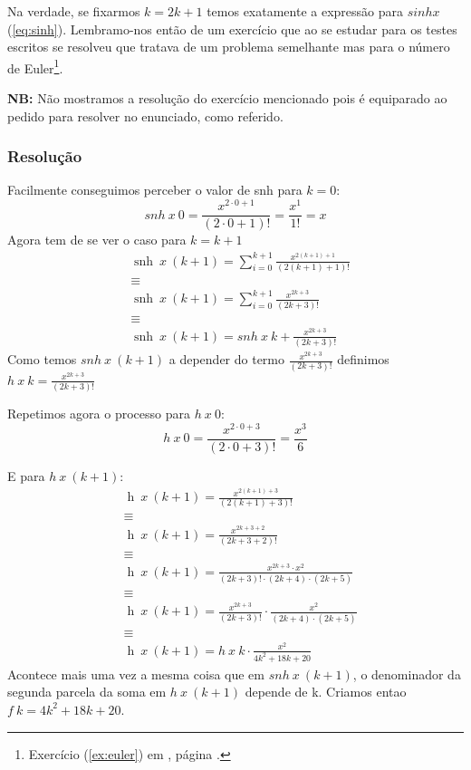 \documentclass[11pt, a4paper, fleqn]{article}
\DeclareMathOperator{\snh}{snh}
\DeclareMathOperator{\h}{h}
\begin{document}
Na verdade, se fixarmos $k = 2k + 1$ temos exatamente a expressão para $sinh x$ (\ref{eq:sinh}). Lembramo-nos então de um exercício que ao se estudar para os testes escritos
se resolveu que tratava de um problema semelhante mas para o número de Euler\footnote{Exercício (\ref{ex:euler}) em \cite{Ol18}, página \pageref{ex:euler}.}.

\noindent
\textbf{NB:} Não mostramos a resolução do exercício mencionado pois é equiparado ao pedido para resolver no enunciado, como referido.

\subsubsection*{Resolução}

Facilmente conseguimos perceber o valor de snh para $k = 0$:
\[
    snh\ x\ 0 = \frac{x^{2 \cdot 0 + 1 }}{(2 \cdot 0 + 1)!} = \frac{x^1}{1!} = x
\]
\noindent
Agora tem de se ver o caso para $k = k + 1$
\[
\begin{split}
    &\snh\ x\ (k + 1) = \sum_{i=0}^{k+1} \frac{x^{2(k + 1) + 1}}{(2(k + 1) + 1)!} \\
    &\equiv \\
    &\snh\ x\ (k + 1) = \sum_{i=0}^{k+1} \frac{x^{2k + 3}}{(2k + 3)!} \\
    &\equiv \\
    &\snh\ x\ (k + 1) = snh\ x\ k + \frac{x^{2k + 3}}{(2k + 3)!}
\end{split} 
\]
\noindent
Como temos $snh\ x\ (k+1)$ a depender do termo $\frac{x^{2k + 3}}{(2k + 3)!}$ definimos $h\ x\ k = \frac{x^{2k + 3}}{(2k + 3)!}$

Repetimos agora o processo para $h\ x\ 0$:
\[
    h\ x\ 0 = \frac{x^{2 \cdot 0 + 3}}{(2 \cdot 0 + 3)!} = \frac{x^3}{6}
\]

E para $h\ x\ (k+1)$:
\[
\begin{split}
    &\h\ x\ (k + 1) = \frac{x^{2(k + 1) + 3}}{(2(k + 1) + 3)!} \\
    &\equiv \\
    &\h\ x\ (k + 1) = \frac{x^{2k + 3 + 2}}{(2k + 3 + 2)!} \\
    &\equiv \\
    &\h\ x\ (k + 1) = \frac{x^{2k + 3} \cdot x^{2}}{(2k + 3)! \cdot (2k + 4) \cdot (2k + 5)} \\
    &\equiv \\
    &\h\ x\ (k + 1) = \frac{x^{2k + 3}}{(2k + 3)!} \cdot \frac{x^{2}}{(2k + 4) \cdot (2k + 5)} \\
    &\equiv \\
    &\h\ x\ (k + 1) = h\ x\ k \cdot \frac{x^{2}}{4k^{2} + 18k + 20}
\end{split} 
\]
\noindent
Acontece mais uma vez a mesma coisa que em $snh\ x\ (k+1)$, o denominador da segunda parcela da soma em $h\ x\ (k+1)$ depende de k. 
Criamos entao $f\ k = 4k^{2} + 18k + 20$.
\end{document}
